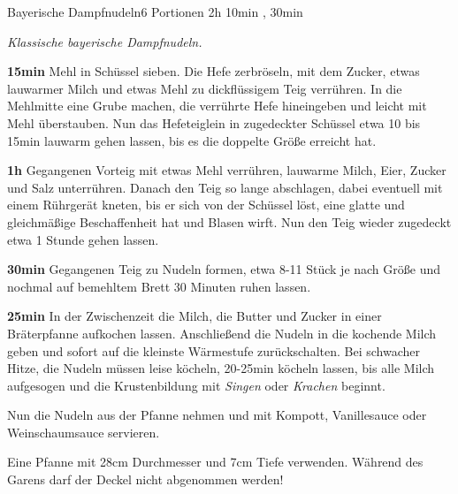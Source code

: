 \documentclass[../recipe-collections/cooking.tex]{subfiles}
\begin{document}
\begin{recipe}{Bayerische Dampfnudeln}{6 Portionen }{2h 10min , 30min }

  \freeform{}\textit{Klassische bayerische Dampfnudeln.}


  \textbf{15min}
  Mehl in Schüssel sieben.
  Die Hefe zerbröseln, mit dem Zucker, etwas lauwarmer Milch und etwas Mehl zu dickflüssigem Teig verrühren.
  In die Mehlmitte eine Grube machen, die verrührte Hefe hineingeben und leicht mit Mehl überstauben.
  Nun das Hefeteiglein in zugedeckter Schüssel etwa 10 bis 15min lauwarm gehen lassen, bis es die doppelte Größe erreicht hat.

  \newstep{}\textbf{1h}
  Gegangenen Vorteig mit etwas Mehl verrühren, lauwarme Milch, Eier, Zucker und Salz unterrühren.
  Danach den Teig so lange abschlagen, dabei eventuell mit einem Rührgerät kneten, bis er sich von der Schüssel löst, eine glatte und gleichmäßige Beschaffenheit hat und Blasen wirft.
  Nun den Teig wieder zugedeckt etwa 1 Stunde gehen lassen.

  \newstep{}\textbf{30min}
  Gegangenen Teig zu Nudeln formen, etwa 8-11 Stück je nach Größe und nochmal auf bemehltem Brett 30 Minuten ruhen lassen.


  \textbf{25min}
  In der Zwischenzeit die Milch, die Butter und Zucker in einer Bräterpfanne aufkochen lassen.
  Anschließend die Nudeln in die kochende Milch geben und sofort auf die kleinste Wärmestufe zurückschalten.
  Bei schwacher Hitze, die Nudeln müssen leise köcheln, 20-25min köcheln lassen, bis alle Milch aufgesogen und die Krustenbildung mit \textit{Singen} oder \textit{Krachen} beginnt.

  \newstep{}Nun die Nudeln aus der Pfanne nehmen und mit Kompott, Vanillesauce oder Weinschaumsauce servieren.

  \freeform{}\hrulefill{}

  \freeform{}
  Eine Pfanne mit 28cm Durchmesser und 7cm Tiefe verwenden. Während des Garens darf der Deckel nicht abgenommen werden!

\end{recipe}
\end{document}
